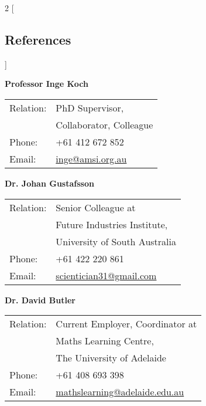 \documentclass[a4paper,12pt]{report}
\begin{document}
\begin{multicols}{2}
[
\subsection*{References}
]

\begin{flushleft}
\textbf{Professor Inge Koch} \\[2pt]
\begin{tabular}{ll}
Relation: & PhD Supervisor, \\
               & Collaborator, Colleague \\
Phone:    & +61 412 672 852 \\
Email:      & \href{mailto:inge@amsi.org.au}{inge@amsi.org.au} \\
\end{tabular}
\end{flushleft}


\begin{flushleft}
\vspace{0.6cm}
\textbf{Dr. Johan Gustafsson} \\[2pt]
\begin{tabular}{ll}
Relation: & Senior Colleague at \\
               & Future Industries Institute, \\
               & University of South Australia \\
Phone:    & +61 422 220 861 \\
Email:      & \href{mailto:scientician31@gmail.com}{scientician31@gmail.com} \\
\end{tabular}
\end{flushleft}



\begin{flushleft}
\textbf{Dr. David Butler} \\[4pt]
\begin{tabular}{ll}
Relation: & Current Employer, Coordinator at \\
               & Maths Learning Centre, \\
               & The University of Adelaide \\
Phone:    & +61 408 693 398 \\
Email:      & \href{mailto:mathslearning@adelaide.edu.au}{mathslearning@adelaide.edu.au } \\
\end{tabular}
\end{flushleft}


\end{multicols}
\end{document}

